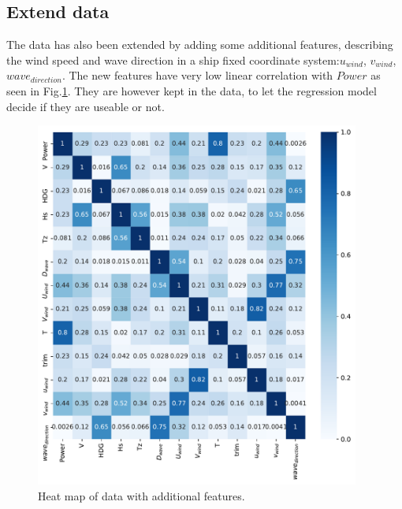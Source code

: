 \subsection*{Extend data}\label{extend-data}
The data has also been extended by adding some additional features,
describing the wind speed and wave direction in a ship fixed coordinate
system:$u_{wind}$, $v_{wind}$, $wave_{direction}$. The new
features have very low linear correlation with $Power$ as seen in
Fig.\ref{fig:heat_map_extended_data}. They are however kept in
the data, to let the regression model decide if they are useable or not.
\begin{figure}[H]
\begin{center}\includegraphics[width = 0.95\textwidth]{figures/heat_map_extended_data.pdf}\end{center}
\vspace{-0.7cm}
\caption{Heat map of data with additional features.}
\label{fig:heat_map_extended_data}
\end{figure}
